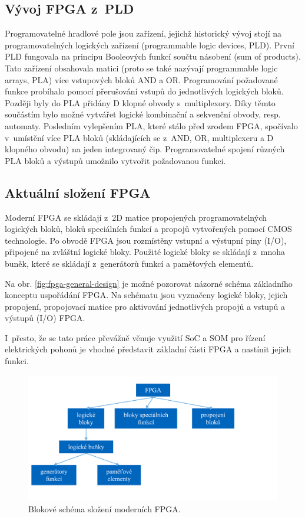 \documentclass[a4paper, twoside, 11pt]{article}
\begin{document}
		\subsection{Vývoj FPGA z~PLD}
		Programovatelné hradlové pole jsou zařízení, jejichž historický vývoj stojí na programovatelných logických zařízení (programmable logic devices, PLD). První PLD fungovala na principu Booleových funkcí součtu násobení (sum of products). Tato zařízení obsahovala matici (proto se také nazývají programmable logic arrays, PLA) více vstupových bloků AND a OR. Programování požadované funkce probíhalo pomocí přerušování vstupů do jednotlivých logických bloků. Později byly do PLA přidány D klopné obvody s~multiplexory. Díky těmto součástím bylo možné vytvářet logické kombinační a sekvenční obvody, resp. automaty. Posledním vylepšením PLA, které stálo před zrodem FPGA, spočívalo v~umístění více PLA bloků (skládajících se z~AND, OR, multiplexeru a D klopného obvodu) na jeden integrovaný čip. Programovatelné spojení různých PLA bloků a výstupů umožnilo vytvořit požadovanou funkci. \cite{Sass2010}\par

		\subsection{Aktuální složení FPGA}
		Moderní FPGA se skládají z~2D matice propojených programovatelných logických bloků, bloků speciálních funkcí a propojů vytvořených pomocí CMOS technologie. Po obvodě FPGA jsou rozmístěny vstupní a výstupní piny (I/O), připojené na zvláštní logické bloky. Použité logické bloky se skládají z~mnoha buněk, které se skládají z~generátorů funkcí a paměťových elementů. \cite{Sass2010}\par
		Na obr. \ref{fig:fpga-general-design} je možné pozorovat názorné schéma základního konceptu uspořádání FPGA. Na schématu jsou vyznačeny logické bloky, jejich propojení, propojovací matice pro aktivování jednotlivých propojů a vstupů a výstupů (I/O) FPGA.\par
		I~přesto, že se tato práce převážně věnuje využití SoC a SOM pro řízení elektrických pohonů je vhodné představit základní části FPGA a nastínit jejich funkci.

		\begin{figure}[htbp!]
			\centering
				\includegraphics[width=1\textwidth]{src/pdf/fpga-skladba.pdf} 
				\caption{Blokové schéma složení moderních FPGA.}
				\label{fig:fpga-skladba}
		\end{figure}
\end{document}
